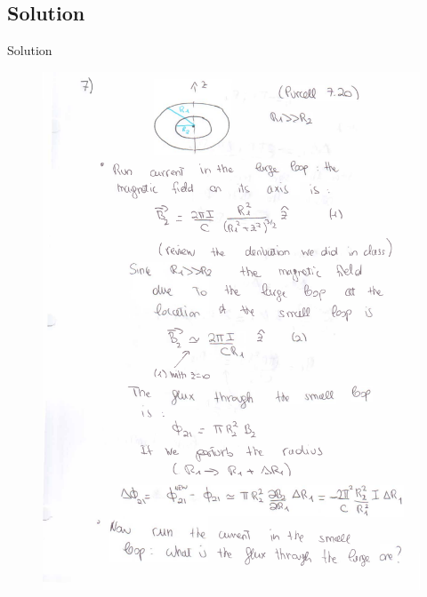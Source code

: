 \documentclass[solutions]{esg8022pset}
\begin{document}
\subsection{Solution}
Solution
  \begin{figure}[H]
    \centering
    \includegraphics[width = 25cm]{ps9_7a}
  \end{figure}
\end{document}
